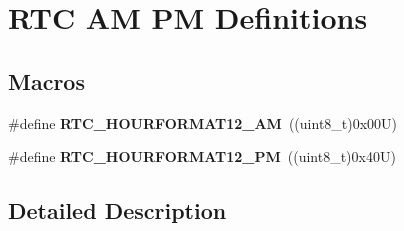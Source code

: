 \hypertarget{group___r_t_c___a_m___p_m___definitions}{}\section{R\+TC AM PM Definitions}
\label{group___r_t_c___a_m___p_m___definitions}
\subsection*{Macros}
\begin{DoxyCompactItemize}
\item 
\mbox{\label{group___r_t_c___a_m___p_m___definitions_ga5be28b0dd8d5d12a6b055a70c46ce24a}} 
\#define {\bfseries R\+T\+C\+\_\+\+H\+O\+U\+R\+F\+O\+R\+M\+A\+T12\+\_\+\+AM}~((uint8\+\_\+t)0x00\+U)
\item 
\mbox{\label{group___r_t_c___a_m___p_m___definitions_gae8662cf2f3080b992d3b119f74f60162}} 
\#define {\bfseries R\+T\+C\+\_\+\+H\+O\+U\+R\+F\+O\+R\+M\+A\+T12\+\_\+\+PM}~((uint8\+\_\+t)0x40\+U)
\end{DoxyCompactItemize}


\subsection{Detailed Description}
